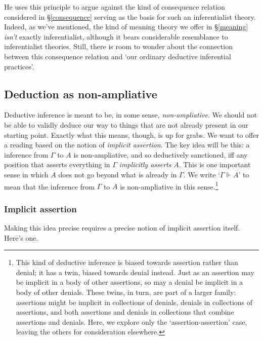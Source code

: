 \documentclass{article}
\newcommand{\G}{\ensuremath{\Gamma}}
\newcommand{\ded}{\Vdash}
\begin{document}
He uses this principle to argue against the kind of consequence relation considered in \S\ref{consequence} serving as the basis for such an inferentialist theory.
Indeed, as we've mentioned, the kind of meaning theory we offer in \S\ref{meaning} {\em isn't} exactly inferentialist, although it bears considerable resemblance to inferentialist theories.
Still, there is room to wonder about the connection between this consequence relation and `our ordinary deductive inferential practices'.

\subsection{Deduction as non-ampliative}

Deductive inference is meant to be, in some sense, {\em non-ampliative}.
We should not be able to validly deduce our way to things that are not already present in our starting point.
Exactly what this means, though, is up for grabs.
We want to offer a reading based on the notion of {\em implicit assertion}.
The key idea will be this: a inference from $\G$ to $A$ is non-ampliative, and so deductively sanctioned, iff any position that asserts everything in $\G$ {\em implicitly asserts} $A$.
This is one important sense in which $A$ does not go beyond what is already in $\G$.
We write `$\G \ded A$' to mean that the inference from $\G$ to $A$ is non-ampliative in this sense.\footnote{This kind of deductive inference is biased towards assertion rather than denial; it has a twin, biased towards denial instead. 
Just as an assertion may be implicit in a body of other assertions, so may a denial be implicit in a body of other denials. 
These twins, in turn, are part of a larger family: assertions might be implicit in collections of denials, denials in collections of assertions, and both assertions and denials in collections that combine assertions and denials.
Here, we explore only the `assertion-assertion' case, leaving the others for consideration elsewhere.}

\subsubsection{Implicit assertion}

Making this idea precise requires a precise notion of implicit assertion itself.
Here's one.
\end{document}
